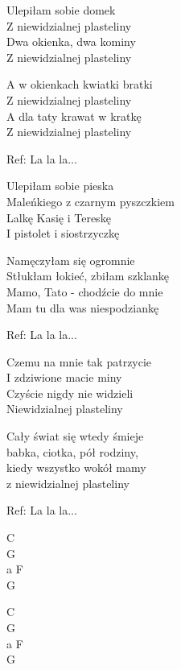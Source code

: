 \begin{text}
    Ulepiłam sobie domek\\
    Z niewidzialnej plasteliny\\
    Dwa okienka, dwa kominy\\
    Z niewidzialnej plasteliny

    A w okienkach kwiatki bratki\\
    Z niewidzialnej plasteliny\\
    A dla taty krawat w kratkę\\
    Z niewidzialnej plasteliny

    \vin Ref: La la la...

    Ulepiłam sobie pieska\\
    Maleńkiego z czarnym pyszczkiem\\
    Lalkę Kasię i Tereskę\\
    I pistolet i siostrzyczkę
    
    Namęczyłam się ogromnie\\
    Stłukłam łokieć, zbiłam szklankę\\
    Mamo, Tato - chodźcie do mnie\\
    Mam tu dla was niespodziankę

    \vin Ref: La la la...

    Czemu na mnie tak patrzycie\\
    I zdziwione macie miny\\
    Czyście nigdy nie widzieli\\
    Niewidzialnej plasteliny

    Cały świat się wtedy śmieje\\
    babka, ciotka, pół rodziny,\\
    kiedy wszystko wokół mamy\\
    z niewidzialnej plasteliny

    \vin Ref: La la la...
\end{text}
\begin{chord}
    C\\
    G\\
    a F\\
    G
    
    C\\
    G\\
    a F\\
    G
\end{chord}